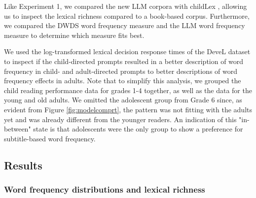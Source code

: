 \documentclass[doc, a4paper]{apa7}
\begin{document}
Like Experiment 1, we compared the new LLM corpora with childLex \cite{schroeder_childlex_2015}, allowing us to inspect the lexical richness compared to a book-based corpus. Furthermore, we compared the DWDS word frequency measure and the LLM word frequency measure to determine which measure fits best. 

We used the log-transformed lexical decision response times of the DeveL dataset to inspect if the child-directed prompts resulted in a better description of word frequency in child- and adult-directed prompts to better descriptions of word frequency effects in adults. Note that to simplify this analysis, we grouped the child reading performance data for grades 1-4 together, as well as the data for the young and old adults. We omitted the adolescent group from Grade 6 since, as evident from Figure \ref{fig:modelcomprt}, the pattern was not fitting with the adults yet and was already different from the younger readers. An indication of this "in-between" state is that adolescents were the only group to show a preference for subtitle-based word frequency. 


\subsection{Results}

\subsubsection*{Word frequency distributions and lexical richness}
\end{document}
